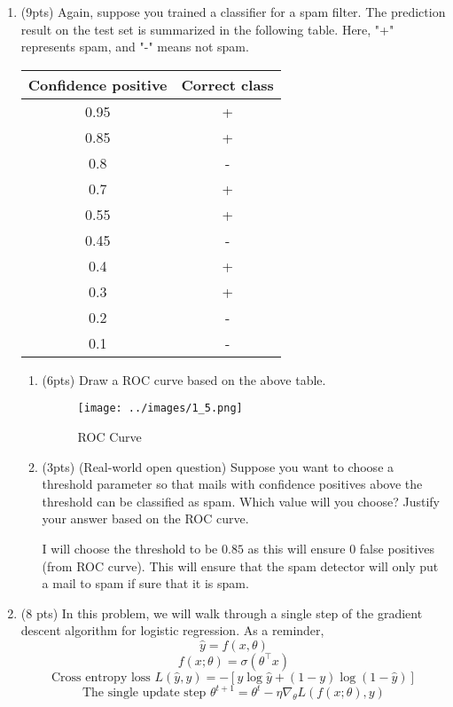\documentclass[a4paper]{article}
\theoremstyle{definition}
\newenvironment{soln}{
    \leavevmode\color{blue}\ignorespaces
}{}
\begin{document}
\begin{enumerate}
\item (9pts) Again, suppose you trained a classifier for a spam filter. The prediction result on the test set is summarized in the following table. Here, "+" represents spam, and "-" means not spam.

\begin{center}
\begin{tabular}{ c  c }
\hline
Confidence positive & Correct class \\ \hline
0.95 & + \\
0.85 & + \\
0.8 & - \\
0.7 & + \\
0.55 & + \\
0.45 & - \\
0.4 & + \\
0.3 & + \\
0.2 & - \\
0.1 & - \\
\hline
\end{tabular}
\end{center}

\begin{enumerate}
	\item (6pts) Draw a ROC curve based on the above table.
	
	\begin{soln}  
	\begin{figure}[H]
		\centering
		\texttt{[image: ../images/1\_5.png]}
		\caption{ROC Curve}
		\label{fig:roc}
	\end{figure}
	
	\end{soln}
	
	\item (3pts) (Real-world open question) Suppose you want to choose a threshold parameter so that mails with confidence positives above the threshold can be classified as spam. Which value will you choose? Justify your answer based on the ROC curve.
	
	\begin{soln}
	I will choose the threshold to be $0.85$ as this will ensure 0 false positives (from ROC curve). This will ensure that the spam detector will only put a mail to spam if sure that it is spam.
	\end{soln}
\end{enumerate}

\item (8 pts) In this problem, we will walk through a single step of the gradient descent algorithm for logistic regression. As a reminder,
$$\hat{y} = f(x, \theta)$$
$$f(x;\theta) = \sigma(\theta^\top x)$$
$$\text{Cross entropy loss } L(\hat{y}, y) = -[y \log  \hat{y} + (1-y)\log(1-\hat{y})]$$
$$\text{The single update step } \theta^{t+1} = \theta^{t} - \eta \nabla_{\theta} L(f(x;\theta), y) $$




\end{enumerate}
\end{document}
